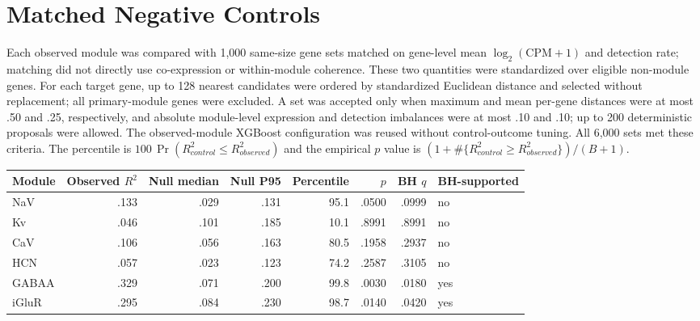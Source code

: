 \documentclass[11pt]{article}
\newcommand{\tablefont}{\fontsize{9.5}{11.2}\selectfont}
\newcommand{\sourcecaption}[1]{\Needspace{10\baselineskip}\vspace{2pt}{\small\bfseries #1}\par\vspace{2pt}}
\begin{document}
\section{Matched Negative Controls}
Each observed module was compared with 1,000 same-size gene sets matched on gene-level mean $\log_2(\mathrm{CPM}+1)$ and detection rate; matching did not directly use co-expression or within-module coherence. These two quantities were standardized over eligible non-module genes. For each target gene, up to 128 nearest candidates were ordered by standardized Euclidean distance and selected without replacement; all primary-module genes were excluded. A set was accepted only when maximum and mean per-gene distances were at most .50 and .25, respectively, and absolute module-level expression and detection imbalances were at most .10 and .10; up to 200 deterministic proposals were allowed. The observed-module XGBoost configuration was reused without control-outcome tuning. All 6,000 sets met these criteria. The percentile is $100\,\Pr(R^2_{control}\le R^2_{observed})$ and the empirical $p$ value is $(1+\#\{R^2_{control}\ge R^2_{observed}\})/(B+1)$.

\sourcecaption{Primary matched-control specificity analysis on unadjusted module scores (Table S18; separate 6-test family).}
\begin{center}\tablefont
\begin{tabular}{lrrrrrrl}
\toprule
Module & Observed $R^2$ & Null median & Null P95 & Percentile & $p$ & BH $q$ & BH-supported \\
\midrule
NaV & .133 & .029 & .131 & 95.1 & .0500 & .0999 & no \\
Kv & .046 & .101 & .185 & 10.1 & .8991 & .8991 & no \\
CaV & .106 & .056 & .163 & 80.5 & .1958 & .2937 & no \\
HCN & .057 & .023 & .123 & 74.2 & .2587 & .3105 & no \\
GABAA & .329 & .071 & .200 & 99.8 & .0030 & .0180 & yes \\
iGluR & .295 & .084 & .230 & 98.7 & .0140 & .0420 & yes \\
\bottomrule
\end{tabular}
\end{center}
\end{document}
